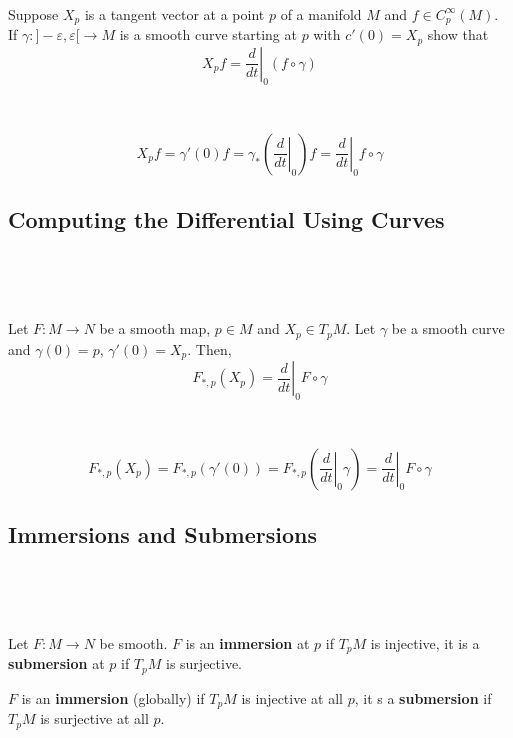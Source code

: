 \documentclass{article}
\begin{document}
\begin{proposition}
  \

Suppose $X_p$ is a tangent vector at a point $p$ of a manifold $M$ and $f \in C^\infty_p(M)$. If $\gamma: ]-\varepsilon, \varepsilon[ \to M$ is a smooth curve starting at $p$ with $c'(0) = X_p$ show that $$X_pf = \left.\frac{d}{dt}\right\vert_0(f \circ \gamma)$$
\end{proposition}

\begin{customproof}
  \

  $$X_pf = \gamma'(0)f= \gamma_* (\left.\frac{d}{dt}\right\vert_0)f = \left.\frac{d}{dt}\right\vert_0 f \circ \gamma$$
\end{customproof}

\subsection{Computing the Differential Using Curves}
\

\begin{proposition}
  \

  Let $F: M\to N$ be a smooth map, $p\in M$ and $X_p \in T_pM$. Let $\gamma$ be a smooth curve and $\gamma(0) = p$, $\gamma'(0) = X_p$. Then, $$F_{*,p}(X_p) = \left.\frac{d}{dt}\right\vert_0 F \circ \gamma$$
\end{proposition}

\begin{customproof}
  \

  $$F_{*,p}(X_p) = F_{*,p}(\gamma'(0)) = F_{*,p}(\left.\frac{d}{dt}\right\vert_0 \gamma) = \left.\frac{d}{dt}\right\vert_0 F \circ \gamma$$
\end{customproof}

\subsection{Immersions and Submersions}
\

\begin{definition}
  \

  Let $F: M \to N$ be smooth. $F$ is an \textbf{immersion} at $p$ if $T_pM$ is injective, it is a \textbf{submersion} at $p$ if $T_pM$ is surjective.

  $F$ is an \textbf{immersion} (globally) if $T_pM$ is injective at all $p$, it s a \textbf{submersion} if $T_pM$ is surjective at all $p$.
\end{definition}
\end{document}
